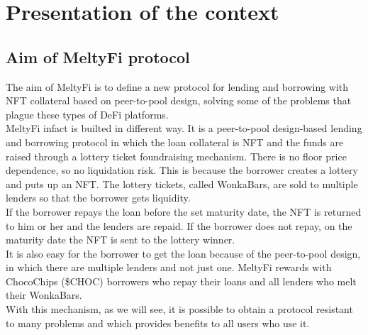 \section{Presentation of the context}\label{sec:presentationOfTheContext}

\subsection{Aim of MeltyFi protocol}
The aim of MeltyFi is to define a new protocol for lending and borrowing with NFT collateral based on peer-to-pool design, solving some of the problems that plague these types of DeFi platforms.
\\
\indent MeltyFi infact is builted in different way. It is a peer-to-pool design-based lending and borrowing protocol in which the loan collateral is NFT and the funds are raised through a lottery ticket foundraising mechanism. There is no floor price dependence, so no liquidation risk. This is because the borrower creates a lottery and puts up an NFT. The lottery tickets, called WonkaBars, are sold to multiple lenders so that the borrower gets liquidity.
\\
\indent If the borrower repays the loan before the set maturity date, the NFT is returned to him or her and the lenders are repaid. If the borrower does not repay, on the maturity date the NFT is sent to the lottery winner.
\\
\indent It is also easy for the borrower to get the loan because of the peer-to-pool design, in which there are multiple lenders and not just one. MeltyFi rewards with ChocoChips (\$CHOC) borrowers who repay their loans and all lenders who melt their WonkaBars.
\\
\indent With this mechanism, as we will see, it is possible to obtain a protocol resistant to many problems and which provides benefits to all users who use it.

